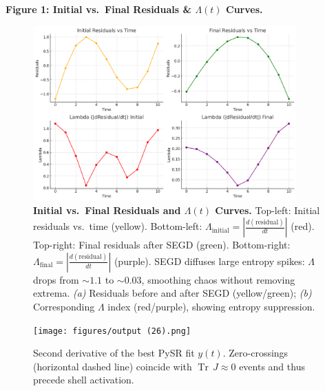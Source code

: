 \documentclass[11pt]{article}
\newcommand{\TrJ}{\operatorname{Tr}\,J}
\begin{document}
\patchcmd{\@**}
  {\normalsize}
  {\normalsize\color{white}} %
\noindent\textbf{Figure 1: Initial vs.\ Final Residuals \& $\Lambda(t)$ Curves.}

\begin{figure}[H]
  \centering
  \includegraphics[width=0.9\textwidth]{figures/output6.png}
  \caption{%
    \textbf{Initial vs.\ Final Residuals and $\Lambda(t)$ Curves.}  
    Top-left: Initial residuals vs.\ time (yellow).  
    Bottom-left: $\Lambda_{\text{initial}} = \left|\frac{d(\text{residual})}{dt}\right|$ (red).  
    Top-right: Final residuals after SEGD (green).  
    Bottom-right: $\Lambda_{\text{final}} = \left|\frac{d(\text{residual})}{dt}\right|$ (purple).  
    SEGD diffuses large entropy spikes: $\Lambda$ drops from $\sim1.1$ to $\sim0.03$, smoothing chaos without removing extrema.  
    \emph{(a)} Residuals before and after SEGD (yellow/green);  
    \emph{(b)} Corresponding $\Lambda$ index (red/purple), showing entropy suppression.
  }
  \label{fig:residuals_lambda_composite}
\end{figure}

\begin{figure}[H]
  \centering
  \texttt{[image: figures/output (26).png]}
  \caption{Second derivative of the best PySR fit $y(t)$. Zero-crossings (horizontal dashed line) coincide with \(\TrJ\!\approx\!0\) events and thus precede shell activation.}
  \label{fig:second_derivative_signal}
\end{figure}
\end{document}
